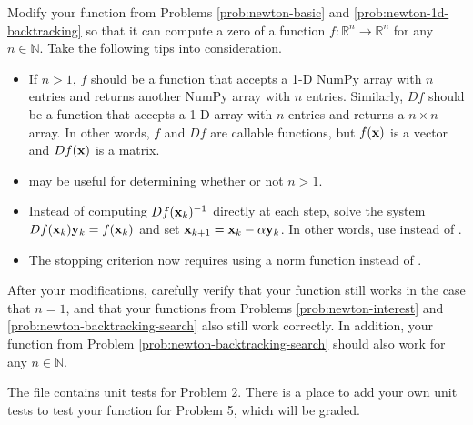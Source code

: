 \begin{problem} %
Modify your function from Problems \ref{prob:newton-basic} and \ref{prob:newton-1d-backtracking} so that it can compute a zero of a function $f:\mathbb{R}^n\rightarrow\mathbb{R}^n$ for any $n\in\mathbb{N}$.
Take the following tips into consideration.
\begin{itemize}
\item If $n > 1$, $f$ should be a function that accepts a 1-D NumPy array with $n$ entries and returns another NumPy array with $n$ entries.
Similarly, $Df$ should be a function that accepts a 1-D array with $n$ entries and returns a $n\times n$ array.
In other words, $f$ and $Df$ are callable functions, but $f(\mathbf{x})$ is a vector and $Df(\mathbf{x})$ is a matrix.

\item {} may be useful for determining whether or not $n > 1$.

\item Instead of computing $Df(\mathbf{x}_k)^{-1}$ directly at each step, solve the system $Df(\mathbf{x}_k)\mathbf{y}_k = f(\mathbf{x}_k)$ and set $\mathbf{x}_{k+1} = \mathbf{x}_k - \alpha\mathbf{y}_k$.
In other words, use  instead of .

\item The stopping criterion now requires using a norm function instead of .
\end{itemize}

After your modifications, carefully verify that your function still works in the case that $n=1$, and that your functions from Problems \ref{prob:newton-interest} and \ref{prob:newton-backtracking-search} also still work correctly.
In addition, your function from Problem \ref{prob:newton-backtracking-search} should also work for any $n \in \mathbb{N}$.
\label{prob:newton-nd-implementation}
\end{problem}

\begin{unittest}
The file  contains unit tests for Problem 2.
There is a place to add your own unit tests to test your function for Problem 5, which will be graded.
\end{unittest}

